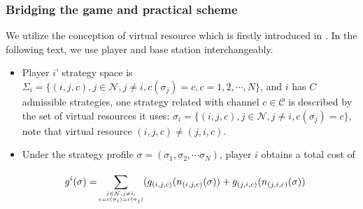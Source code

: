 \subsubsection*{Bridging the game and practical scheme}
\label{gameforproblem}
We utilize the conception of virtual resource which is firstly introduced in \cite{allerton08_liu}. In the following text, we use player and base station interchangeably.

\begin{itemize}
\item Player $i$' strategy space is $\Sigma_i=\{(i,j,c), j\in \mathcal{N}, j\ne i, c(\sigma_j)=c, c=1,2,\cdots,N\}$, and $i$ has $C$ admissible strategies, one strategy related with channel $c\in\mathcal{C}$ is described by the set of virtual resources it uses: $\sigma_i=\{(i,j,c), j\in \mathcal{N}, j\ne i, c(\sigma_j)=c\}$, note that virtual resource $(i,j,c)\neq(j,i,c)$.

\item Under the strategy profile $\sigma=(\sigma_1, \sigma_2, \cdots \sigma_N)$, player $i$ obtains a total cost of 

	\begin{equation}
\label{6}
		\begin{split}
		g^i(\sigma)=
		& \sum\limits^{}_{\tiny\substack{j\in \mathcal{N},j\neq i,\\ c=c(\sigma_i)=c(\sigma_j)}} (g_{(i,j,c)}(n_{(i,j,c)}(\sigma))+g_{(j,i,c)}(n_{(j,i,c)}(\sigma))
		\end{split}
		\end{equation}
\end{itemize}

